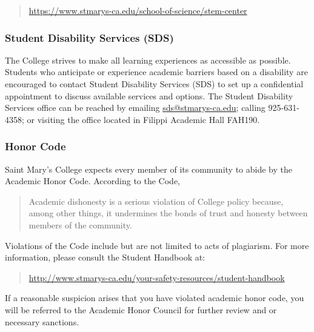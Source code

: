 \documentclass[letterpaper,12pt,fleqn]{article}
\begin{document}
\begin{quote}
  {\small\url{https://www.stmarys-ca.edu/school-of-science/stem-center}}
\end{quote}

\subsubsection*{Student Disability Services (SDS)}

The College strives to make all learning experiences as accessible as possible.  Students who anticipate or
experience academic barriers based on a disability are encouraged to contact Student Disability Services (SDS) to
set up a confidential appointment to discuss available services and options.  The Student Disability Services
office can be reached by emailing {\small\url{sds@stmarys-ca.edu}}; calling 925-631-4358; or visiting the office
located in Filippi Academic Hall FAH190.

\subsubsection*{Honor Code}

Saint Mary’s College expects every member of its community to abide by the Academic Honor Code.  According to the Code,

\begin{quote}
  Academic dishonesty is a serious violation of College policy because, among other things, it undermines the bonds of
  trust and honesty between members of the community.
\end{quote}

Violations of the Code include but are not limited to acts of plagiarism.  For more information, please consult the
Student Handbook at:

\begin{quote}
  {\small\url{http://www.stmarys-ca.edu/your-safety-resources/student-handbook}}
\end{quote}

If a reasonable suspicion arises that you have violated academic honor code, you will be referred to the Academic
Honor Council for further review and or necessary sanctions.
\end{document}
